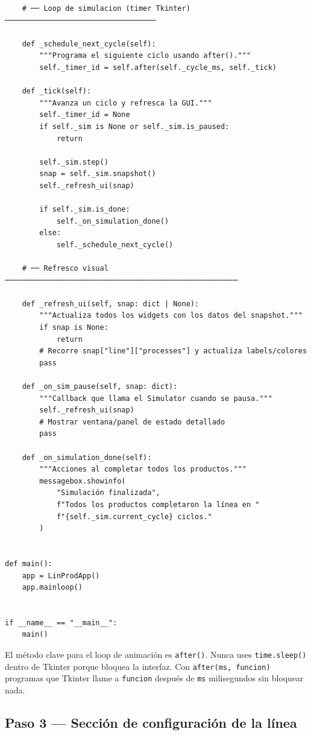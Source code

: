 \documentclass[12pt,letterpaper]{article}
\begin{document}
\begin{lstlisting}
    # ── Loop de simulacion (timer Tkinter) ───────────────────────────────────

    def _schedule_next_cycle(self):
        """Programa el siguiente ciclo usando after()."""
        self._timer_id = self.after(self._cycle_ms, self._tick)

    def _tick(self):
        """Avanza un ciclo y refresca la GUI."""
        self._timer_id = None
        if self._sim is None or self._sim.is_paused:
            return

        self._sim.step()
        snap = self._sim.snapshot()
        self._refresh_ui(snap)

        if self._sim.is_done:
            self._on_simulation_done()
        else:
            self._schedule_next_cycle()

    # ── Refresco visual ──────────────────────────────────────────────────────

    def _refresh_ui(self, snap: dict | None):
        """Actualiza todos los widgets con los datos del snapshot."""
        if snap is None:
            return
        # Recorre snap["line"]["processes"] y actualiza labels/colores
        pass

    def _on_sim_pause(self, snap: dict):
        """Callback que llama el Simulator cuando se pausa."""
        self._refresh_ui(snap)
        # Mostrar ventana/panel de estado detallado
        pass

    def _on_simulation_done(self):
        """Acciones al completar todos los productos."""
        messagebox.showinfo(
            "Simulación finalizada",
            f"Todos los productos completaron la línea en "
            f"{self._sim.current_cycle} ciclos."
        )


def main():
    app = LinProdApp()
    app.mainloop()


if __name__ == "__main__":
    main()
\end{lstlisting}

\begin{info}
El método clave para el loop de animación es \texttt{after()}. Nunca uses
\texttt{time.sleep()} dentro de Tkinter porque bloquea la interfaz. Con
\texttt{after(ms, funcion)} programas que Tkinter llame a \texttt{funcion}
después de \texttt{ms} milisegundos sin bloquear nada.
\end{info}

\subsection{Paso 3 — Sección de configuración de la línea}
\end{document}
